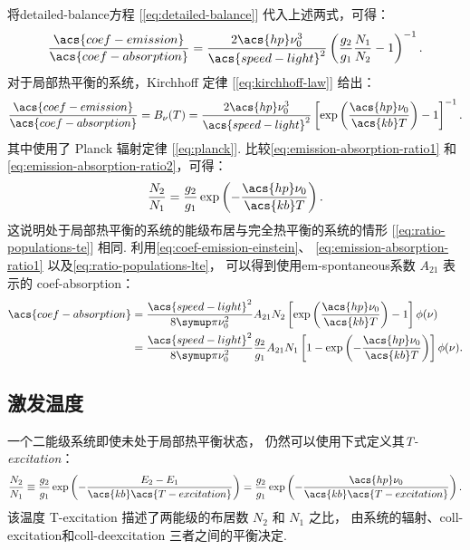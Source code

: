 将\ac{detailed-balance}方程 [\autoref{eq:detailed-balance}]
代入上述两式，可得：
\begin{equation}
  \label{eq:emission-absorption-ratio1}
  \frac{\acs{coef-emission}}{\acs{coef-absorption}}
    = \frac{2 \acs{hp} \nu_0^3}{\acs{speed-light}^2}
      \left( \frac{g_2}{g_1} \frac{N_1}{N_2} - 1 \right)^{-1} .
\end{equation}
对于局部热平衡的系统，Kirchhoff 定律 [\autoref{eq:kirchhoff-law}] 给出：
\begin{equation}
  \label{eq:emission-absorption-ratio2}
  \frac{\acs{coef-emission}}{\acs{coef-absorption}}
    = B_{\nu}(T)
    = \frac{2 \acs{hp} \nu_0^3}{\acs{speed-light}^2} \left[
      \exp\left( \frac{\acs{hp} \nu_0}{\acs{kb} T} \right) - 1 \right]^{-1}.
\end{equation}
其中使用了 Planck 辐射定律 [\autoref{eq:planck}].
比较\autoref{eq:emission-absorption-ratio1}
和\autoref{eq:emission-absorption-ratio2}，可得：
\begin{equation}
  \label{eq:ratio-populations-lte}
  \frac{N_2}{N_1}
    = \frac{g_2}{g_1} \exp\left( -\frac{\acs{hp} \nu_0}{\acs{kb} T} \right) .
\end{equation}
这说明处于局部热平衡的系统的能级布居与完全热平衡的系统的情形
[\autoref{eq:ratio-populations-te}] 相同.
利用\autoref{eq:coef-emission-einstein}、
\autoref{eq:emission-absorption-ratio1}
以及\autoref{eq:ratio-populations-lte}，
可以得到使用\ac{em-spontaneous}系数 $A_{21}$ 表示的 \ac{coef-absorption}：
\begin{align}
  \acs{coef-absorption}
    & = \frac{\acs{speed-light}^2}{8\Cpi \nu_0^2} A_{21} N_2
      \left[ \exp\left( \frac{\acs{hp} \nu_0}{\acs{kb} T} \right) - 1 \right]
      \phi(\nu)
    \label{eq:coef-absorption-einstein2} \\
    & = \frac{\acs{speed-light}^2}{8\Cpi \nu_0^2} \frac{g_2}{g_1} A_{21} N_1
      \left[ 1 - \exp\left( -\frac{\acs{hp} \nu_0}{\acs{kb} T} \right) \right]
      \phi(\nu) .
    \label{eq:coef-absorption-einstein3}
\end{align}

\subsection{激发温度}

一个二能级系统即使未处于局部热平衡状态，
仍然可以使用下式定义其\emph{\acf{T-excitation}}：
\begin{equation}
  \label{eq:t-excitation-def}
  \frac{N_2}{N_1} \equiv \frac{g_2}{g_1}
    \exp\left(- \frac{E_2-E_1}{\acs{kb} \acs{T-excitation}} \right)
    = \frac{g_2}{g_1}
      \exp\left( -\frac{\acs{hp} \nu_0}{\acs{kb} \acs{T-excitation}} \right) .
\end{equation}
该温度 \acs{T-excitation} 描述了两能级的布居数 $N_2$ 和 $N_1$ 之比，
由系统的辐射、\ac{coll-excitation}和\ac{coll-deexcitation} 三者之间的平衡决定.

